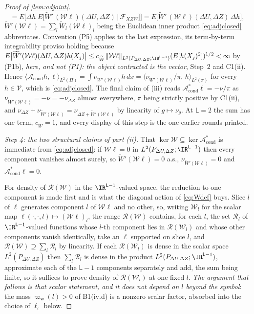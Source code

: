 \begin{proof}[Proof of \cref{lem:adjoint}]
\[=E\Big[\Delta h\;E\big[\widetilde W'\,(\mathcal W\ell)(\Delta U,\Delta Z)\,\big|\,\mathcal F_{XZW}\big]\Big]
=E\Big[\widetilde W'\,(\mathcal W\ell)(\Delta U,\Delta Z)\,\Delta h\Big],
\]
$\widetilde W'(\mathcal W\ell)=\sum_{l}\widetilde W_l(\mathcal W\ell)_l$ being the Euclidean inner
product \eqref{eq:adjclosed} abbreviates.
Convention (P5) applies to the last expression, its term-by-term integrability proviso holding because
$E\big|\widetilde W'(\mathcal W\ell)(\Delta U,\Delta Z)h(X_j)\big|
\le c_{\widetilde W}\|\mathcal W\ell\|_{L^{2}(P_{\Delta U,\Delta Z};\IR^{\mathsf L-1})}(E[h(X_j)^{2}])^{1/2}<\infty$
by \textup{(P1b)}, \emph{here, and not \textup{(P1)}: the object contracted is the vector}, Step~2 and
C1(ii). Hence
$\langle\mathcal A_{\mathrm{cond}}h,\ell\rangle_{L^{2}(\Pi)}
=\int\nu_{\widetilde W'(\mathcal W\ell)}h\,dx
=\langle\nu_{\widetilde W'(\mathcal W\ell)}/\pi,\,h\rangle_{L^{2}(\pi)}$ for every $h\in\mathcal V$, which
is \eqref{eq:adjclosed}. The final claim of (iii) reads $\mathcal A^\ast_{\mathrm{cond}}\ell=-\nu/\pi$ as
$\nu_{\widetilde W'(\mathcal W\ell)}=-\nu=-\nu_{\Delta Z}$ almost everywhere, $\pi$ being strictly
positive by C1(ii), and $\nu_{\Delta Z}+\nu_{\widetilde W'(\mathcal W\ell)}=\nu_{\Delta Z+\widetilde W'(\mathcal W\ell)}$
by linearity of $g\mapsto\nu_g$.
At $\mathsf L=2$ the sum has one term, $c_{\widetilde W}=1$, and every display of this step is the
one earlier rounds printed.

\emph{Step 4: the two structural claims of part (ii).}
That $\ker\mathcal W\subseteq\ker\mathcal A^\ast_{\mathrm{cond}}$ is immediate from
\eqref{eq:adjclosed}: if $\mathcal W\ell=0$ in $L^{2}(P_{\Delta U,\Delta Z};\IR^{\mathsf L-1})$ then
every component vanishes almost surely, so
$\widetilde W'(\mathcal W\ell)=0$ a.s., $\nu_{\widetilde W'(\mathcal W\ell)}=0$ and
$\mathcal A^\ast_{\mathrm{cond}}\ell=0$.

For density of $\mathcal R(\mathcal W)$ in the $\IR^{\mathsf L-1}$-valued space, the reduction to
one component is made first and is what the diagonal action of \eqref{eq:Wdef} buys. Slice $l$ of
$\ell$ generates component $l$ of $\mathcal W\ell$ and no other, so, writing $\mathcal W_l$ for the
scalar map $\ell(\cdot,\cdot,l)\mapsto(\mathcal W\ell)_l$, the range $\mathcal R(\mathcal W)$ contains,
for each $l$, the set $\mathcal R_l$ of $\IR^{\mathsf L-1}$-valued functions whose $l$-th component lies
in $\mathcal R(\mathcal W_l)$ and whose other components vanish identically, take an $\ell$ supported
on slice $l$, and $\mathcal R(\mathcal W)\supseteq\sum_l\mathcal R_l$
by linearity. If each $\mathcal R(\mathcal W_l)$ is dense in the scalar space
$L^{2}(P_{\Delta U,\Delta Z})$ then $\sum_l\mathcal R_l$ is dense in the product
$L^{2}(P_{\Delta U,\Delta Z};\IR^{\mathsf L-1})$, approximate each of the $\mathsf L-1$ components
separately and add, the sum being finite, so it suffices to prove density of $\mathcal R(\mathcal W_l)$
at one fixed $l$. \emph{The argument that follows is that scalar statement, and it does not depend on
$l$ beyond the symbol}: the mass $\varpi_{\mathsf w}(l)>0$ of B1(iv.d) is a nonzero scalar factor, absorbed
into the choice of $\ell_\epsilon$ below.


\end{proof}
